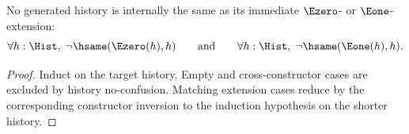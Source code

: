 \begin{theorem}
\label{thm:history-extension-self-absurd}
No generated history is internally the same as its immediate \(\Ezero\)- or
\(\Eone\)-extension:
$$
\forall h:\Hist,\; \neg\hsame(\Ezero(h),h)
\qquad\text{and}\qquad
\forall h:\Hist,\; \neg\hsame(\Eone(h),h).
$$
\end{theorem}
\begin{proof}
Induct on the target history. Empty and cross-constructor cases are excluded
by history no-confusion. Matching extension cases reduce by the corresponding
constructor inversion to the induction hypothesis on the shorter history.
\end{proof}
